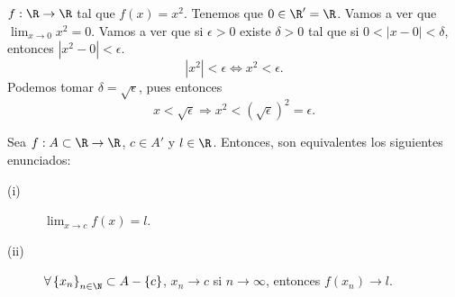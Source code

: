 \begin{eg}
\normalfont $\displaystyle f : \R \to \R $ tal que $\displaystyle f\left(x\right) = x^{2} $. Tenemos que $\displaystyle 0 \in \R' = \R $. Vamos a ver que $\displaystyle \lim_{x \to 0}x^{2} =0 $. Vamos a ver que si $\displaystyle \epsilon > 0 $ existe $\displaystyle \delta > 0 $ tal que si $\displaystyle 0 < \left|x-0\right|<\delta  $, entonces $\displaystyle \left|x^{2}-0\right| < \epsilon  $.
\[ \left|x^{2}\right| < \epsilon \iff x^{2} < \epsilon  .\]
Podemos tomar $\displaystyle \delta = \sqrt{\epsilon } $, pues entonces
\[x < \sqrt{\epsilon } \Rightarrow x^{2} < \left(\sqrt{\epsilon }\right)^{2} = \epsilon  .\]
\end{eg}

\begin{ftheorem}
\normalfont Sea $\displaystyle f: A \subset\R \to \R $, $\displaystyle c \in A' $ y $\displaystyle l \in \R $. Entonces, son equivalentes los siguientes enunciados:
\begin{description}
\item[(i)] $\displaystyle \lim_{x \to c}f\left(x\right) = l $.
\item[(ii)] $\displaystyle \forall \left\{ x_{n}\right\} _{n\in\N}\subset A- \left\{ c\right\}  $, $\displaystyle x_{n} \to c $ si $\displaystyle n \to \infty $, entonces $\displaystyle f\left(x_{n}\right) \to l $.
\end{description}
\end{ftheorem}
